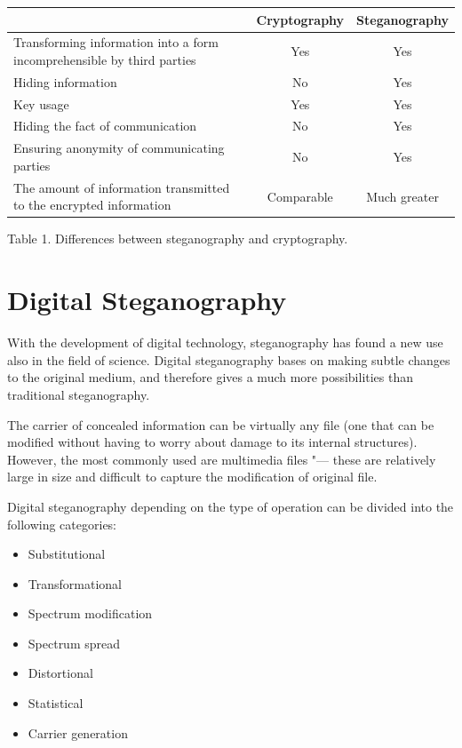 \documentclass[10pt, a5paper]{article}
\begin{document}
\begin{table}[t!]
\begin{center}
\begin{tabular}{P{13em}|c|c}
\hline
                                                                            & Cryptography & Steganography \\
\hline
Transforming information into a form in\-compre\-hensible by third parties  &     Yes      &     Yes       \\
Hiding information                                                          &     No       &     Yes       \\
Key usage                                                                   &     Yes      &     Yes       \\
Hiding the fact of commu\-ni\-ca\-tion                                      &     No       &     Yes       \\
Ensuring anonymity of commu\-ni\-ca\-ting parties                           &     No       &     Yes       \\
The amount of information transmitted to the encrypted information          &  Comparable  &  Much greater \\
\hline
\end{tabular}

Table 1. Differences between steganography and cryptography.
\end{center}
\end{table}

\section{Digital Steganography}

With the development of digital technology, steganography has found a new use also in the field of science. Digital steganography bases on making subtle changes to the original medium, and therefore gives a much more possibilities than traditional steganography.

The carrier of concealed information can be virtually any file (one that can be modified without having to worry about damage to its internal structures). However, the most commonly used are multimedia files "--- these are relatively large in size and difficult to capture the modification of original file.

Digital steganography depending on the type of operation can be divided into the following categories:

\begin{itemize}
  \item Substitutional
  \item Transformational
  \item Spectrum modification
  \item Spectrum spread
  \item Distortional
  \item Statistical
  \item Carrier generation
\end{itemize}
\end{document}
